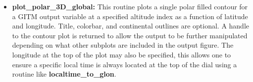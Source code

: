 \begin{itemize}
\item[]{{\bf plot\_polar\_3D\_global:} This routine plots a single polar filled contour for a GITM output variable at a specified altitude index as a function of latitude and longitude.  Title, colorbar, and continental outlines are optional.  A handle to the contour plot is returned to allow the output to be further manipulated depending on what other subplots are included in the output figure.  The longitude at the top of the plot may also be specified, this allows one to ensure a specific local time is always located at the top of the dial using a routine like {\bf localtime\_to\_glon}.} 
\end{itemize}

\begin{figure}
\begin{center}
\end{center}
\end{figure}
